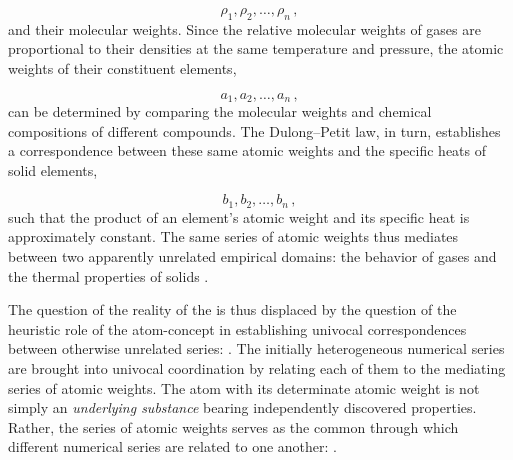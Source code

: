 \documentclass[submitted,12pt]{article}
\begin{document}

\begin{equation*}
\rho_1, \rho_2, \ldots, \rho_n\,,
\end{equation*}
%
and their molecular weights. Since the relative molecular weights of gases are proportional to their densities at the same temperature and pressure, the atomic weights of their constituent elements,

\begin{equation*}
a_1, a_2, \ldots, a_n\,,
\end{equation*}
%
can be determined by comparing the molecular weights and chemical compositions of different compounds. The Dulong--Petit law, in turn, establishes a correspondence between these same atomic weights and the specific heats of solid elements,

\begin{equation*}
b_1, b_2, \ldots, b_n\,,
\end{equation*}
%
such that the product of an element's atomic weight and its specific heat is approximately constant. The same series of atomic weights thus mediates between two apparently unrelated empirical domains: the behavior of gases and the thermal properties of solids .

The question of the reality of the  is thus displaced by the question of the heuristic role of the atom-concept in establishing univocal correspondences between otherwise unrelated series:  . The initially heterogeneous numerical series are brought into univocal coordination  by relating each of them to the mediating series of atomic weights. The atom with its determinate atomic weight is not simply an \emph{underlying substance} bearing independently discovered properties. Rather, the series of atomic weights serves as the common  through which different numerical series are related to one another:  .
\end{document}

